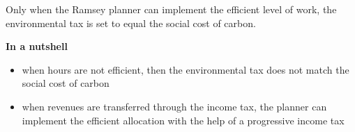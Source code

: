 Only when the Ramsey planner can implement the efficient level of work, the environmental tax is set to equal the social cost of carbon.   

\textbf{In a nutshell}
\begin{itemize}
	\item when hours are not efficient, then the environmental tax does not match the social cost of carbon
	\item when revenues are transferred through the income tax, the planner can implement the efficient allocation with the help of a progressive income tax
\end{itemize}